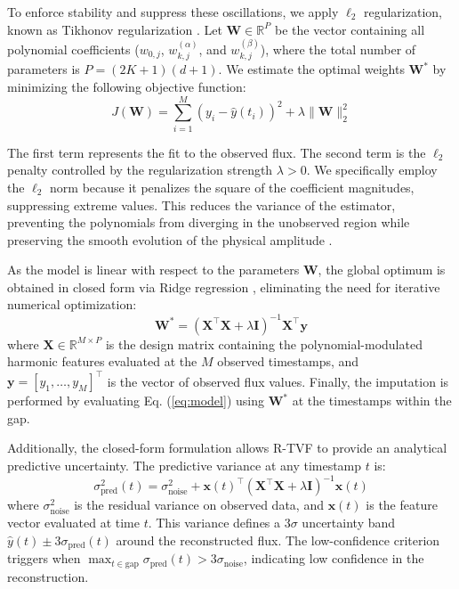 \documentclass[a4paper,fleqn]{cas-sc}
\begin{document}
To enforce stability and suppress these oscillations, we apply $\ell_2$ regularization, known as Tikhonov regularization \cite{feng2022tikhonov}. Let $\mathbf{W} \in \mathbb{R}^P$ be the vector containing all polynomial coefficients ($w_{0,j}$, $w_{k,j}^{(\alpha)}$, and $w_{k,j}^{(\beta)}$), where the total number of parameters is $P = (2K + 1)(d + 1)$. We estimate the optimal weights $\mathbf{W}^*$ by minimizing the following objective function:
\begin{equation}
    J(\mathbf{W}) = \sum_{i=1}^{M} \left( y_i - \hat{y}(t_i) \right)^2 + \lambda \|\mathbf{W}\|_2^2
\end{equation}

The first term represents the fit to the observed flux. The second term is the $\ell_2$ penalty controlled by the regularization strength $\lambda > 0$. We specifically employ the $\ell_2$ norm because it penalizes the square of the coefficient magnitudes, suppressing extreme values. This reduces the variance of the estimator, preventing the polynomials from diverging in the unobserved region while preserving the smooth evolution of the physical amplitude \cite{gillariose2026lasso}.

As the model is linear with respect to the parameters $\mathbf{W}$, the global optimum is obtained in closed form via Ridge regression \cite{gillariose2026lasso}, eliminating the need for iterative numerical optimization:
\begin{equation}
    \mathbf{W}^* = \left( \mathbf{X}^\top \mathbf{X} + \lambda \mathbf{I} \right)^{-1} \mathbf{X}^\top \mathbf{y}
\end{equation}
where $\mathbf{X}\in \mathbb{R}^{M\times P}$ is the design matrix containing the polynomial-modulated harmonic features evaluated at the $M$ observed timestamps, and $\mathbf{y} = [y_1, \ldots, y_M]^\top$ is the vector of observed flux values. Finally, the imputation is performed by evaluating Eq. (\ref{eq:model}) using $\mathbf{W}^*$ at the timestamps within the gap.

{\color{blue}Additionally, the closed-form formulation allows R-TVF to provide an analytical predictive uncertainty. The predictive variance at any timestamp $t$ is:
\begin{equation} \label{eq:uncertainty}
    \sigma_{\text{pred}}^2(t) = \sigma_{\text{noise}}^2 + \mathbf{x}(t)^\top \left( \mathbf{X}^\top \mathbf{X} + \lambda \mathbf{I} \right)^{-1} \mathbf{x}(t)
\end{equation}
where $\sigma_{\text{noise}}^2$ is the residual variance on observed data, and $\mathbf{x}(t)$ is the feature vector evaluated at time $t$. This variance defines a $3\sigma$ uncertainty band $\hat{y}(t) \pm 3\sigma_{\text{pred}}(t)$ around the reconstructed flux. The low-confidence criterion triggers when $\max_{t \in \text{gap}} \sigma_{\text{pred}}(t) > 3\sigma_{\text{noise}}$, indicating low confidence in the reconstruction.
}
\end{document}
